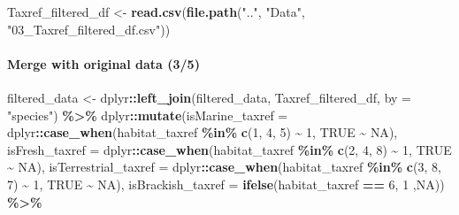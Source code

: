 \documentclass[
]{article}
\newenvironment{Shaded}{\begin{snugshade}}{\end{snugshade}}
\newcommand{\AttributeTok}[1]{\textcolor[rgb]{0.13,0.29,0.53}{#1}}
\newcommand{\ConstantTok}[1]{\textcolor[rgb]{0.56,0.35,0.01}{#1}}
\newcommand{\DecValTok}[1]{\textcolor[rgb]{0.00,0.00,0.81}{#1}}
\newcommand{\FunctionTok}[1]{\textcolor[rgb]{0.13,0.29,0.53}{\textbf{#1}}}
\newcommand{\NormalTok}[1]{#1}
\newcommand{\OtherTok}[1]{\textcolor[rgb]{0.56,0.35,0.01}{#1}}
\newcommand{\SpecialCharTok}[1]{\textcolor[rgb]{0.81,0.36,0.00}{\textbf{#1}}}
\newcommand{\StringTok}[1]{\textcolor[rgb]{0.31,0.60,0.02}{#1}}
\begin{document}
\begin{Shaded}
\begin{Highlighting}[]
\NormalTok{Taxref\_filtered\_df }\OtherTok{\textless{}{-}} \FunctionTok{read.csv}\NormalTok{(}\FunctionTok{file.path}\NormalTok{(}\StringTok{".."}\NormalTok{, }\StringTok{"Data"}\NormalTok{, }\StringTok{"03\_Taxref\_filtered\_df.csv"}\NormalTok{))}
\end{Highlighting}
\end{Shaded}

\hypertarget{merge-with-original-data-35}{%
\paragraph{Merge with original data
(3/5)}\label{merge-with-original-data-35}}

\begin{Shaded}
\begin{Highlighting}[]
\NormalTok{filtered\_data }\OtherTok{\textless{}{-}}\NormalTok{ dplyr}\SpecialCharTok{::}\FunctionTok{left\_join}\NormalTok{(filtered\_data, Taxref\_filtered\_df, }\AttributeTok{by =} \StringTok{"species"}\NormalTok{) }\SpecialCharTok{\%\textgreater{}\%}
\NormalTok{  dplyr}\SpecialCharTok{::}\FunctionTok{mutate}\NormalTok{(}\AttributeTok{isMarine\_taxref =}\NormalTok{ dplyr}\SpecialCharTok{::}\FunctionTok{case\_when}\NormalTok{(habitat\_taxref }\SpecialCharTok{\%in\%} \FunctionTok{c}\NormalTok{(}\DecValTok{1}\NormalTok{, }\DecValTok{4}\NormalTok{, }\DecValTok{5}\NormalTok{) }\SpecialCharTok{\textasciitilde{}} \DecValTok{1}\NormalTok{, }\ConstantTok{TRUE} \SpecialCharTok{\textasciitilde{}} \ConstantTok{NA}\NormalTok{),}
         \AttributeTok{isFresh\_taxref =}\NormalTok{ dplyr}\SpecialCharTok{::}\FunctionTok{case\_when}\NormalTok{(habitat\_taxref }\SpecialCharTok{\%in\%} \FunctionTok{c}\NormalTok{(}\DecValTok{2}\NormalTok{, }\DecValTok{4}\NormalTok{, }\DecValTok{8}\NormalTok{) }\SpecialCharTok{\textasciitilde{}} \DecValTok{1}\NormalTok{, }\ConstantTok{TRUE} \SpecialCharTok{\textasciitilde{}} \ConstantTok{NA}\NormalTok{),}
         \AttributeTok{isTerrestrial\_taxref =}\NormalTok{ dplyr}\SpecialCharTok{::}\FunctionTok{case\_when}\NormalTok{(habitat\_taxref }\SpecialCharTok{\%in\%} \FunctionTok{c}\NormalTok{(}\DecValTok{3}\NormalTok{, }\DecValTok{8}\NormalTok{, }\DecValTok{7}\NormalTok{) }\SpecialCharTok{\textasciitilde{}} \DecValTok{1}\NormalTok{, }\ConstantTok{TRUE} \SpecialCharTok{\textasciitilde{}} \ConstantTok{NA}\NormalTok{),}
         \AttributeTok{isBrackish\_taxref =} \FunctionTok{ifelse}\NormalTok{(habitat\_taxref }\SpecialCharTok{==} \DecValTok{6}\NormalTok{, }\DecValTok{1}\NormalTok{ ,}\ConstantTok{NA}\NormalTok{)) }\SpecialCharTok{\%\textgreater{}\%}

\end{Highlighting}
\end{Shaded}
\end{document}
